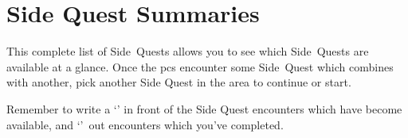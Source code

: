 \chapter{Side Quest Summaries}
\label{sqSummaries}

\begin{multicols}{2}

\noindent
This complete list of Side~Quests allows you to see which Side~Quests are available at a glance.
Once the \glspl{pc} encounter some Side~Quest which combines with another, pick another Side Quest in the area to continue or start.

Remember to write a `\sqr' in front of the Side Quest encounters which have become available, and `'~out encounters which you've completed.

\end{multicols}


